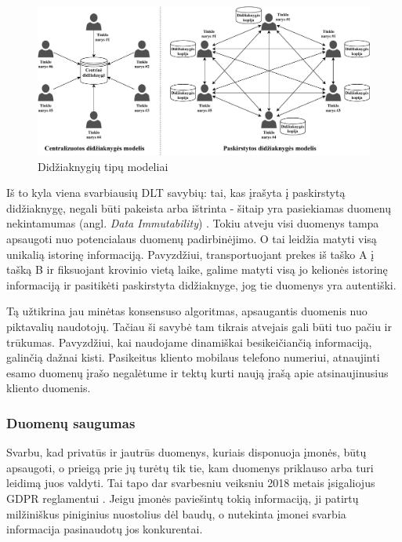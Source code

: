 \begin{figure}[H]
    \centering
    \includegraphics[scale=0.65]{images/ledger-model-types}
    \caption{Didžiaknygių tipų modeliai}
\end{figure}

Iš to kyla viena svarbiausių DLT savybių: tai, kas įrašyta į paskirstytą didžiaknygę, negali būti pakeista arba ištrinta - šitaip yra pasiekiamas duomenų nekintamumas (angl. \textit{Data Immutability}) \cite{xu2017dl}. Tokiu atveju visi duomenys tampa apsaugoti nuo potencialaus duomenų padirbinėjimo. O tai leidžia matyti visą unikalią istorinę informaciją. Pavyzdžiui, transportuojant prekes iš taško A į tašką B ir fiksuojant krovinio vietą laike, galime matyti visą jo kelionės istorinę informaciją ir pasitikėti paskirstyta didžiaknyge, jog tie duomenys yra autentiški. 

Tą užtikrina jau minėtas konsensuso algoritmas, apsaugantis duomenis nuo piktavalių naudotojų. Tačiau ši savybė tam tikrais atvejais gali būti tuo pačiu ir trūkumas. Pavyzdžiui, kai naudojame dinamiškai besikeičiančią informaciją, galinčią dažnai kisti. Pasikeitus kliento mobilaus telefono numeriui, atnaujinti esamo duomenų įrašo negalėtume ir tektų kurti naują įrašą apie atsinaujinusius kliento duomenis.




\subsubsection{Duomenų saugumas}

Svarbu, kad privatūs ir jautrūs duomenys, kuriais disponuoja įmonės, būtų apsaugoti, o prieigą prie jų turėtų tik tie, kam duomenys priklauso arba turi leidimą juos valdyti. Tai tapo dar svarbesniu veiksniu 2018 metais įsigaliojus GDPR reglamentui \cite{ferrari2018eu}. Jeigu įmonės paviešintų tokią informaciją, ji patirtų milžiniškus piniginius nuostolius dėl baudų, o nutekinta įmonei svarbia informacija pasinaudotų jos konkurentai.

